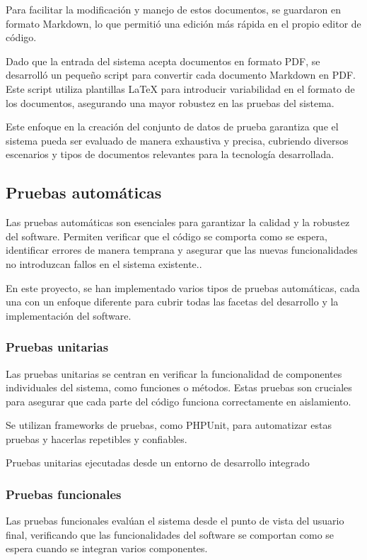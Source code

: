 Para facilitar la modificación y manejo de estos documentos, se guardaron en formato Markdown, lo que permitió una
edición más rápida en el propio editor de código.

Dado que la entrada del sistema acepta documentos en formato PDF, se desarrolló un pequeño script para convertir cada
documento Markdown en PDF. Este script utiliza plantillas LaTeX para introducir variabilidad en el formato de los
documentos, asegurando una mayor robustez en las pruebas del sistema.


Este enfoque en la creación del conjunto de datos de prueba garantiza que el sistema pueda ser evaluado de manera
exhaustiva y precisa, cubriendo diversos escenarios y tipos de documentos relevantes para la tecnología desarrollada.

\subsection*{Pruebas automáticas}
Las pruebas automáticas son esenciales para garantizar la calidad y la robustez del software. Permiten verificar que el
código se comporta como se espera, identificar errores de manera temprana y asegurar que las nuevas funcionalidades no
introduzcan fallos en el sistema existente..

En este proyecto, se han implementado varios tipos de pruebas automáticas, cada una con un enfoque diferente para cubrir
todas las facetas del desarrollo y la implementación del software.

\subsubsection*{Pruebas unitarias}
Las pruebas unitarias se centran en verificar la funcionalidad de componentes individuales del sistema, como funciones o
métodos. Estas pruebas son cruciales para asegurar que cada parte del código funciona correctamente en aislamiento.

Se utilizan frameworks de pruebas, como PHPUnit, para automatizar estas pruebas y hacerlas repetibles y confiables.


Pruebas unitarias ejecutadas desde un entorno de desarrollo integrado

\subsubsection*{Pruebas funcionales}
Las pruebas funcionales evalúan el sistema desde el punto de vista del usuario final, verificando que las
funcionalidades del software se comportan como se espera cuando se integran varios componentes.


